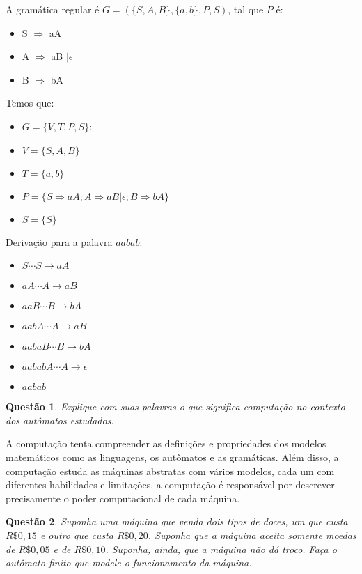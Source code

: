 \documentclass{article}
\newtheorem{problem}{Questão}
\begin{document}
\begin{solution} A gramática regular é $G = (\{S,A,B\},\{a,b\},P,S)$, tal que $P$ é: 
\begin{itemize}
    \item S $\Rightarrow$ aA
    \item A $\Rightarrow$ aB $| \epsilon$
    \item B $\Rightarrow$ bA
\end{itemize}
Temos que:
\begin{itemize}
    \item $G =\{V,T,P,S\}$:
\item $V = \{S,A,B\}$
\item $T = \{a,b\}$
\item $P = \{S \Rightarrow aA; A \Rightarrow aB | \epsilon; B \Rightarrow bA\}$
\item $S = \{S\}$
\end{itemize}
Derivação para a palavra $aabab$:
\begin{itemize}
    \item $S \cdots S\rightarrow aA$
    \item $aA \cdots A\rightarrow aB$
    \item $aaB \cdots B\rightarrow bA$
    \item $aabA \cdots A\rightarrow aB$
    \item $aabaB \cdots B\rightarrow bA$
    \item $aababA \cdots A\rightarrow \epsilon$
    \item $aabab$
\end{itemize}
\end{solution}

\begin{problem} Explique com suas palavras o que significa computação no contexto dos autômatos estudados.
\end{problem}

\begin{solution} A computação tenta compreender as definições e propriedades dos modelos matemáticos como as linguagens, os autômatos e as gramáticas. Além disso, a computação estuda as máquinas abstratas com vários modelos, cada um com diferentes habilidades e limitações, a computação é responsável por descrever precisamente o poder computacional de cada máquina.
\end{solution}

\begin{problem} Suponha uma máquina que venda dois tipos de doces, um que custa $R\$0,15$ e outro que custa
$R\$0,20$. Suponha que a máquina aceita somente moedas de $R\$0,05$ e de $R\$0,10$. Suponha,
ainda, que a máquina não dá troco. Faça o autômato finito que modele o funcionamento da
máquina.
\end{problem}
\end{document}

